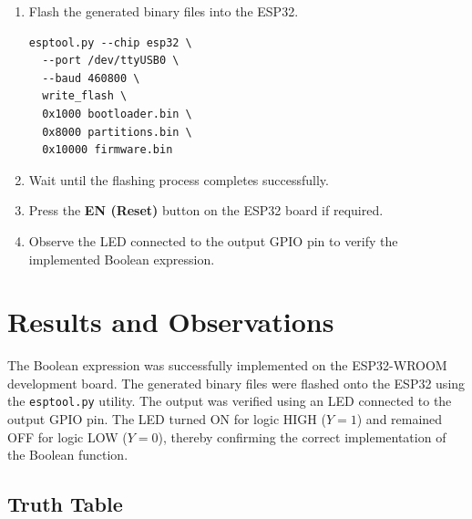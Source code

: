 \documentclass[12pt,a4paper]{article}
\begin{document}
\begin{enumerate}
\item Flash the generated binary files into the ESP32.

\begin{verbatim}
esptool.py --chip esp32 \
  --port /dev/ttyUSB0 \
  --baud 460800 \
  write_flash \
  0x1000 bootloader.bin \
  0x8000 partitions.bin \
  0x10000 firmware.bin
\end{verbatim}

\item Wait until the flashing process completes successfully.

\item Press the \textbf{EN (Reset)} button on the ESP32 board if required.

\item Observe the LED connected to the output GPIO pin to verify the implemented Boolean expression.

\end{enumerate}
\section*{Results and Observations}

The Boolean expression was successfully implemented on the ESP32-WROOM development board. The generated binary files were flashed onto the ESP32 using the \texttt{esptool.py} utility. The output was verified using an LED connected to the output GPIO pin. The LED turned ON for logic HIGH ($Y=1$) and remained OFF for logic LOW ($Y=0$), thereby confirming the correct implementation of the Boolean function.

\subsection*{Truth Table}
\end{document}
